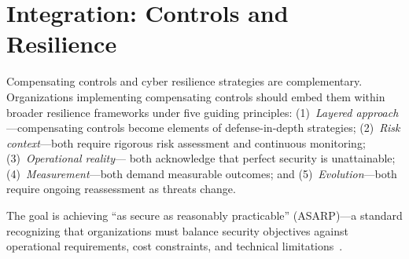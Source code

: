 \documentclass[sigconf,nonacm]{acmart}
\begin{document}
\section{Integration: Controls and Resilience}

Compensating controls and cyber resilience strategies are complementary. Organizations
implementing compensating controls should embed them within broader resilience frameworks
under five guiding principles: (1)~\textit{Layered approach}---compensating controls
become elements of defense-in-depth strategies; (2)~\textit{Risk context}---both require
rigorous risk assessment and continuous monitoring; (3)~\textit{Operational reality}---
both acknowledge that perfect security is unattainable; (4)~\textit{Measurement}---both
demand measurable outcomes; and (5)~\textit{Evolution}---both require ongoing
reassessment as threats change.

The goal is achieving ``as secure as reasonably practicable'' (ASARP)---a standard
recognizing that organizations must balance security objectives against operational
requirements, cost constraints, and technical limitations~\cite{kelley2023,
guidehouse2023}.
\end{document}
